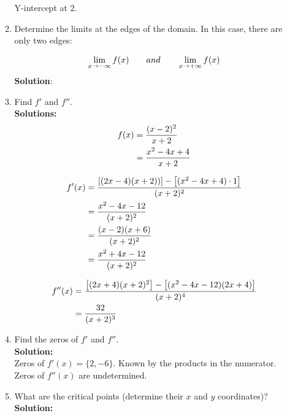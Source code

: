 \documentclass[a4paper]{article}
\begin{document}
\begin{enumerate}
\begin{enumerate}
Y-intercept at 2.\\
	
	
	
	
	\item Determine the limits at the edges of the domain. In this case, there are only two edges:
	
	\begin{align}
	\lim_{x \to -\infty }f(x) \qquad and \qquad \lim_{x \to +\infty}f(x)\notag	
	\end{align}	
	\textbf{Solution}:\\
	
	\item Find $f'$ and $f''$.\\
	\textbf{Solutions:}\\
	
\begin{align}
	f(x) &= \frac{(x-2)^2}{x+2}\notag\\
	&= \frac{x^2 - 4x + 4}{x+2}\notag
\end{align}	
	
\begin{align}
	f'(x) &=  \frac{\left[ (2x - 4)(x+2))\right] - \left[ (x^2 - 4x +4) \cdot 1\right]}{(x+2)^2}\notag\\
	&= \frac{x^2 - 4x - 12}{(x+2)^2}\notag\\
	&= \frac{(x-2)(x+6)}{(x+2)^2}\notag\\
	&= \frac{x^2 + 4x - 12}{(x+2)^2}\notag
\end{align}


\begin{align}
	f''(x) &= \frac{\left[(2x+4)(x+2)^2\right] - \left[ (x^2-4x-12)(2x+4)\right]}{(x+2)^4}\notag\\
	&= \frac{32}{(x+2)^3}\notag
\end{align}

	
	
	\item Find the zeros of $f'$ and $f''$.\\
	\textbf{Solution:}\\
	
Zeros of $f'(x) = \{ 2,-6\}$. Known by the products in the numerator.\\

Zeros of $f''(x)$ are undetermined.\\	
	
	
	
	\item What are the critical points (determine their $x$ and $y$ coordinates)?\\
	\textbf{Solution:}\\
	

\end{enumerate}
\end{enumerate}
\end{document}
